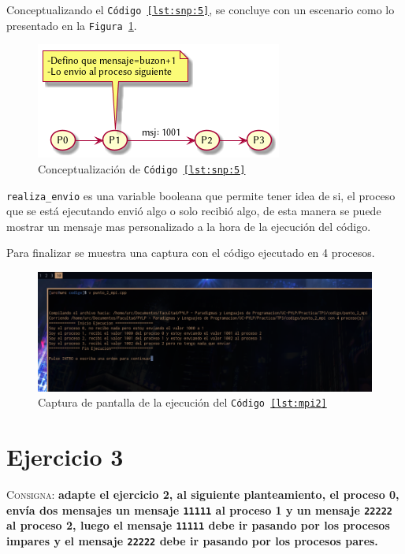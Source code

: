 \documentclass{article}
\begin{document}
Conceptualizando el \texttt{C\'odigo \ref{lst:snp:5}}, se concluye con un
escenario como lo presentado en la \texttt{Figura \ref{fig:conej2_3}}.

\begin{figure}[H]
  \centering
  \includegraphics[width=.4\linewidth]{EJ2_003}
  \caption{Conceptualizaci\'on de \texttt{C\'odigo \ref{lst:snp:5}}}
  \label{fig:conej2_3}
\end{figure}

\texttt{realiza\_envio} es una variable booleana que permite tener idea de si,
el proceso que se est\'a ejecutando envi\'o algo o solo recibi\'o algo, de esta
manera se puede mostrar un mensaje mas personalizado a la hora de la
ejecuci\'on del c\'odigo.

Para finalizar se muestra una captura con el c\'odigo ejecutado en 4 procesos.

\begin{figure}[H]
  \centering
  \includegraphics[width=.95\linewidth]{EJ2_Captura}
  \caption{Captura de pantalla de la ejecuci\'on del \texttt{C\'odigo \ref{lst:mpi2}}}
  \label{fig:ej2_captura}
\end{figure}

\section{Ejercicio 3}
\label{sec:ej3}
\textsc{Consigna}: \textbf{adapte el ejercicio 2, al siguiente planteamiento,
el proceso 0, env\'ia dos mensajes un mensaje \texttt{11111} al proceso 1 y un
mensaje \texttt{22222} al proceso 2, luego el mensaje \texttt{11111} debe ir
pasando por los procesos impares y el mensaje \texttt{22222} debe ir pasando
por los procesos pares.}


\end{document}
